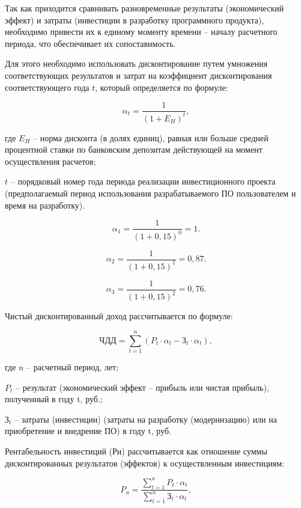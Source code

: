 Так как приходится сравнивать разновременные результаты (экономический эффект) и затраты (инвестиции в  разработку программного продукта), необходимо привести их к единому моменту времени -- началу расчетного периода, что обеспечивает их сопоставимость.  

Для этого необходимо использовать дисконтирование путем умножения соответствующих результатов и затрат на коэффициент дисконтирования соответствующего года $t$, который определяется по формуле:

\begin{equation}
    \alpha _{t} = \frac{1}{(1 + E_{H})^{t}}, 
\end{equation}

где $E_{H}$ -- норма дисконта (в долях единиц), равная или больше средней процентной ставки по банковским депозитам действующей на момент осуществления расчетов; 

    $t$ -- порядковый номер года периода реализации инвестиционного проекта (предполагаемый период использования разрабатываемого ПО пользователем и время на разработку).

$$
    \alpha _{1} = \frac{1}{(1 + 0,15)^{0}} =  1.
$$

$$
    \alpha _{2} = \frac{1}{(1 + 0,15)^{1}} =  0,87.
$$

$$
    \alpha _{3} = \frac{1}{(1 + 0,15)^{2}} =  0,76.
$$

Чистый дисконтированный доход  рассчитывается по формуле:

\begin{equation}
    \text{ЧДД} = \sum_{t=1}^{n}{(P_{t}\cdot \alpha _{t} - \text{З}_{t}\cdot \alpha _{t})}, 
\end{equation}

где $n$ -- расчетный период, лет;    

    $P_{t}$ -- результат (экономический эффект – прибыль или чистая прибыль), полученный в  году t,  руб.; 
    
    $\text{З}_{t}$ -- затраты (инвестиции) (затраты на разработку (модернизацию) или на приобретение и внедрение ПО) в году t, руб.



Рентабельность инвестиций (Ри) рассчитывается как отношение суммы дисконтированных результатов (эффектов) к осуществленным инвестициям:

\begin{equation}
    P_{u}=\frac{\sum_{t=1}^{n}{P_{t} \cdot \alpha _{t}}}{\sum_{t=1}^{n}{\text{З}_{t}\cdot \alpha _{t}}}, 
\end{equation}

